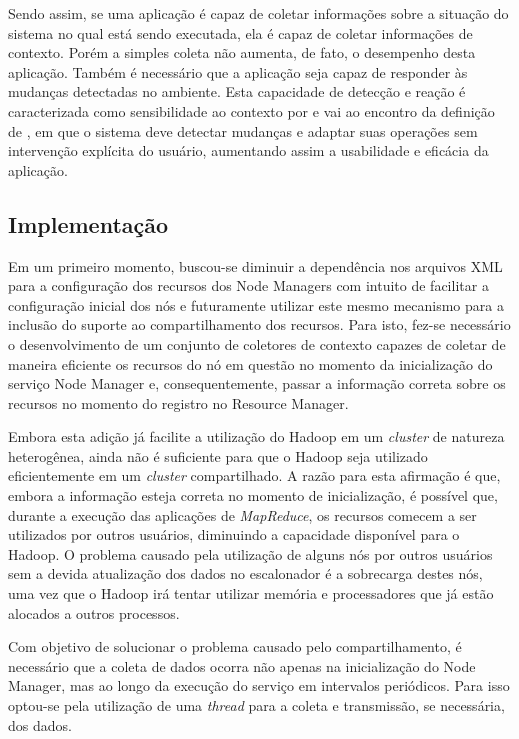Sendo assim, se uma aplicação é capaz de coletar informações sobre a situação do sistema no qual está sendo executada, ela é capaz de coletar informações de contexto. Porém a simples coleta não aumenta, de fato, o desempenho desta aplicação. Também é necessário que a aplicação seja capaz de responder às mudanças detectadas no ambiente. Esta capacidade de detecção e reação é caracterizada como sensibilidade ao contexto por \citet{Maamar} e vai ao encontro da definição de \citet{Baldauf}, em que o sistema deve detectar mudanças e adaptar suas operações sem intervenção explícita do usuário, aumentando assim a usabilidade e eficácia da aplicação.

\subsection{Implementação}
Em um primeiro momento, buscou-se diminuir a dependência nos arquivos XML para a configuração dos recursos dos Node Managers com intuito de facilitar a configuração inicial dos nós e futuramente utilizar este mesmo mecanismo para a inclusão do suporte ao compartilhamento dos recursos. Para isto, fez-se necessário o desenvolvimento de um conjunto de coletores de contexto capazes de coletar de maneira eficiente os recursos do nó em questão no momento da inicialização do serviço Node Manager e, consequentemente, passar a informação correta sobre os recursos no momento do registro no Resource Manager.

Embora esta adição já facilite a utilização do Hadoop em um \textit{cluster} de natureza heterogênea, ainda não é suficiente para que o Hadoop seja utilizado eficientemente em um \textit{cluster} compartilhado. A razão para esta afirmação é que, embora a informação esteja correta no momento de inicialização, é possível que, durante a execução das aplicações de \textit{MapReduce}, os recursos comecem a ser utilizados por outros usuários, diminuindo a capacidade disponível para o Hadoop. O problema causado pela utilização de alguns nós por outros usuários sem a devida atualização dos dados no escalonador é a sobrecarga destes nós, uma vez que o Hadoop irá tentar utilizar memória e processadores que já estão alocados a outros processos.

Com objetivo de solucionar o problema causado pelo compartilhamento, é necessário que a coleta de dados ocorra não apenas na inicialização do Node Manager, mas ao longo da execução do serviço em intervalos periódicos. Para isso optou-se pela utilização de uma \textit{thread} para a coleta e transmissão, se necessária, dos dados.

